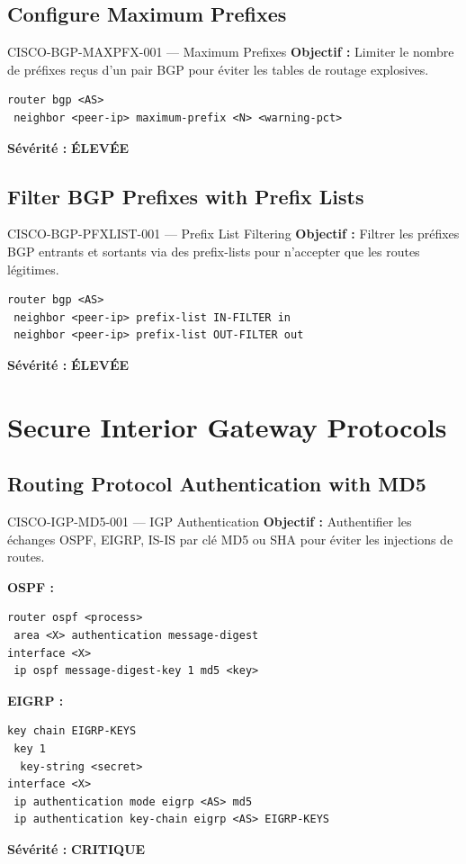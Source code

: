 \documentclass[12pt, a4paper]{report}
\begin{document}
\subsection{Configure Maximum Prefixes}

\begin{rulebox}{CISCO-BGP-MAXPFX-001 — Maximum Prefixes}
  \textbf{Objectif :} Limiter le nombre de préfixes reçus d'un pair BGP pour éviter les tables de routage explosives.

  \begin{lstlisting}
router bgp <AS>
 neighbor <peer-ip> maximum-prefix <N> <warning-pct>
  \end{lstlisting}

  \textbf{Sévérité :} \textcolor{accentOrange}{\textbf{ÉLEVÉE}}
\end{rulebox}

\subsection{Filter BGP Prefixes with Prefix Lists}

\begin{rulebox}{CISCO-BGP-PFXLIST-001 — Prefix List Filtering}
  \textbf{Objectif :} Filtrer les préfixes BGP entrants et sortants via des prefix-lists pour n'accepter que les routes légitimes.

  \begin{lstlisting}
router bgp <AS>
 neighbor <peer-ip> prefix-list IN-FILTER in
 neighbor <peer-ip> prefix-list OUT-FILTER out
  \end{lstlisting}

  \textbf{Sévérité :} \textcolor{accentOrange}{\textbf{ÉLEVÉE}}
\end{rulebox}

\section{Secure Interior Gateway Protocols}

\subsection{Routing Protocol Authentication with MD5}

\begin{rulebox}{CISCO-IGP-MD5-001 — IGP Authentication}
  \textbf{Objectif :} Authentifier les échanges OSPF, EIGRP, IS-IS par clé MD5 ou SHA pour éviter les injections de routes.

  \textbf{OSPF :}
  \begin{lstlisting}
router ospf <process>
 area <X> authentication message-digest
interface <X>
 ip ospf message-digest-key 1 md5 <key>
  \end{lstlisting}

  \textbf{EIGRP :}
  \begin{lstlisting}
key chain EIGRP-KEYS
 key 1
  key-string <secret>
interface <X>
 ip authentication mode eigrp <AS> md5
 ip authentication key-chain eigrp <AS> EIGRP-KEYS
  \end{lstlisting}

  \textbf{Sévérité :} \textcolor{accentRed}{\textbf{CRITIQUE}}
\end{rulebox}
\end{document}
